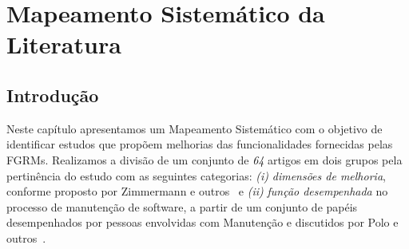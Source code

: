 
\chapter{Mapeamento Sistemático da Literatura}
\label{ch:mapeamento-sistematico}

\section{Introdução}
\label{sec:map-intro}



Neste capítulo apresentamos um Mapeamento Sistemático com o objetivo de
identificar estudos que propõem melhorias das funcionalidades fornecidas pelas
FGRMs. Realizamos a divisão de um conjunto de \textit{64} artigos em dois grupos
pela pertinência do estudo com as seguintes categorias: \textit{(i)}
\textit{dimensões de melhoria}, conforme proposto por Zimmermann e
outros~\cite{zimmermann2009improving} e \textit{(ii)} \textit{função
    desempenhada} no processo de manutenção de software, a partir de um conjunto
de papéis desempenhados por pessoas envolvidas com Manutenção e discutidos por
Polo e outros~\cite{Polo1999}.

